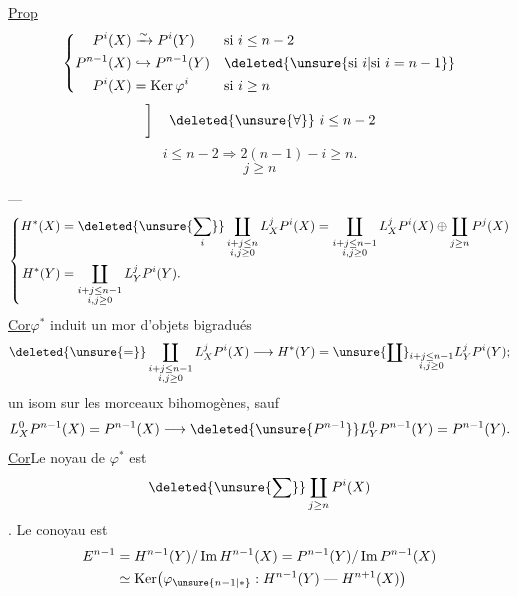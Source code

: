 \uline{Prop}
\[
\left\{\begin{aligned}
P^i(X)&\xrightarrow{\sim}P^i(Y) &&\text{si }i\leq n-2\\
P^{n-1}(X)&\hookrightarrow P^{n-1}(Y) &&\deleted{\unsure{\text{si }i|\text{si }i=n-1}}\\
P^i(X)&=\operatorname{Ker}\varphi^i &&\text{si }i\geq n
\end{aligned}\right.
\]
\[\left.\vphantom{\begin{matrix}H^i(X)\\H^i(Y)\end{matrix}}\right]\quad\deleted{\unsure{\forall}}\ i\leq n-2\]
\[i\leq n-2\Rightarrow 2(n-1)-i\geq n.\]
\[j\geq n\]

\uline{}\qquad {} ---
\[
\left\{\begin{aligned}
H^*(X)&=\deleted{\unsure{\sum_i}}\coprod_{\substack{i+j\leq n\\i,j\geq0}}L_X^jP^i(X)
=\coprod_{\substack{i+j\leq n-1\\i,j\geq0}}L_X^jP^i(X)\oplus\coprod_{j\geq n}P^j(X)\\
H^*(Y)&=\coprod_{\substack{i+j\leq n-1\\i,j\geq0}}L_Y^jP^i(Y).
\end{aligned}\right.
\]
\uline{Cor}\qquad $\varphi^*$ induit un mor d'objets bigradués
\[
\deleted{\unsure{=}}\coprod_{\substack{i+j\leq n-1\\i,j\geq0}}L_X^jP^i(X)
\longrightarrow H^*(Y)=\unsure{\coprod}_{\substack{i+j\leq n-1\\i,j\geq0}}L_Y^jP^i(Y);\]
  un isom sur les morceaux bihomogènes, sauf
\[
L_X^0P^{n-1}(X)=P^{n-1}(X)\longrightarrow\deleted{\unsure{P^{n-1}}}L_Y^0P^{n-1}(Y)=P^{n-1}(Y).
\]
\uline{Cor}\qquad Le noyau de $\varphi^*$ est 
\[\deleted{\unsure{\sum}}\coprod_{j\geq n}P^i(X)\]
. Le conoyau est
\[
\begin{aligned}
E^{n-1}&=H^{n-1}(Y)/\operatorname{Im}H^{n-1}(X)=P^{n-1}(Y)/\operatorname{Im}P^{n-1}(X)\\
&\simeq\operatorname{Ker}\bigl(\varphi_{\unsure{n-1|*}}:H^{n-1}(Y)\mathrel{\text{---}}H^{n+1}(X)\bigr)
\end{aligned}
\]
